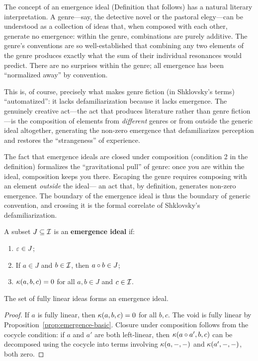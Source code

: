 \begin{interpretation}\label{interp:ch5:emergence_ideals_genres}
The concept of an emergence ideal (Definition that follows) has a natural
literary interpretation. A genre---say, the detective novel or the pastoral
elegy---can be understood as a collection of ideas that, when composed
with each other, generate no emergence: within the genre, combinations are
purely additive. The genre's conventions are so well-established that
combining any two elements of the genre produces exactly what the sum of
their individual resonances would predict. There are no surprises within
the genre; all emergence has been ``normalized away'' by convention.

This is, of course, precisely what makes genre fiction (in Shklovsky's
terms) ``automatized'': it lacks defamiliarization because it lacks
emergence. The genuinely creative act---the act that produces literature
rather than genre fiction---is the composition of elements from
\emph{different} genres or from outside the generic ideal altogether,
generating the non-zero emergence that defamiliarizes perception and
restores the ``strangeness'' of experience.

The fact that emergence ideals are closed under composition (condition 2
in the definition) formalizes the ``gravitational pull'' of genre: once
you are within the ideal, composition keeps you there. Escaping the
genre requires composing with an element \emph{outside} the ideal---
an act that, by definition, generates non-zero emergence. The boundary
of the emergence ideal is thus the boundary of generic convention, and
crossing it is the formal correlate of Shklovsky's defamiliarization.
\end{interpretation}

\begin{definition}
A subset $J \subseteq \mathcal{I}$ is an \textbf{emergence ideal} if:
\begin{enumerate}
    \item $\varepsilon \in J$;
    \item If $a \in J$ and $b \in \mathcal{I}$, then $a \circ b \in J$;
    \item $\kappa(a, b, c) = 0$ for all $a, b \in J$ and $c \in \mathcal{I}$.
\end{enumerate}
\end{definition}

\begin{proposition}
The set of fully linear ideas forms an emergence ideal.
\end{proposition}
\begin{proof}
If $a$ is fully linear, then $\kappa(a, b, c) = 0$ for all $b, c$.
The void is fully linear by
Proposition~\ref{prop:emergence-basic}. Closure under composition follows
from the cocycle condition: if $a$ and $a'$ are both left-linear, then
$\kappa(a \circ a', b, c)$ can be decomposed using the cocycle into
terms involving $\kappa(a, -, -)$ and $\kappa(a', -, -)$, both zero.
\end{proof}

